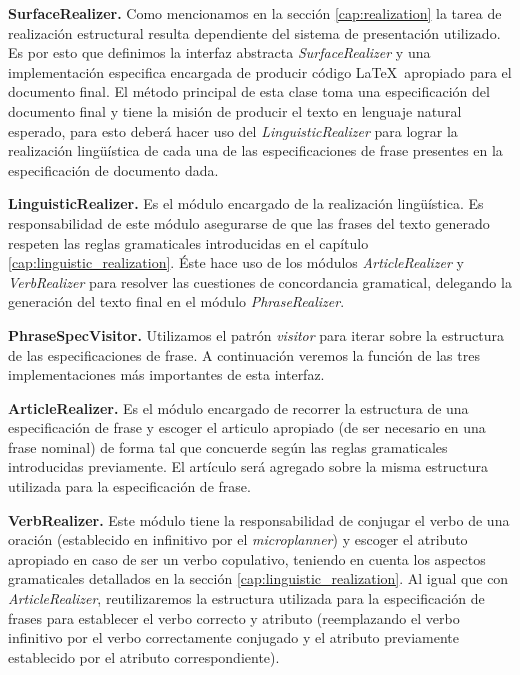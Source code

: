 \bigskip
\noindent
\textbf{SurfaceRealizer.} Como mencionamos en la sección \ref{cap:realization} la tarea de realización estructural resulta dependiente del sistema de presentación utilizado. Es por esto que definimos la interfaz abstracta \textit{SurfaceRealizer} y una implementación especifica encargada de producir código \LaTeX~apropiado para el documento final. El método principal de esta clase toma una especificación del documento final y tiene la misión de producir el texto en lenguaje natural esperado, para esto deberá hacer uso del \textit{LinguisticRealizer} para lograr la realización lingüística de cada una de las especificaciones de frase presentes en la especificación de documento dada. 


\bigskip
\noindent
\textbf{LinguisticRealizer.} Es el módulo encargado de la realización lingüística. Es responsabilidad de este módulo asegurarse de que las frases del texto generado respeten las reglas gramaticales introducidas en el capítulo \ref{cap:linguistic_realization}. Éste hace uso de los módulos \textit{ArticleRealizer} y \textit{VerbRealizer} para resolver las cuestiones de concordancia gramatical, delegando la generación del texto final en el módulo \textit{PhraseRealizer}. 

\bigskip
\noindent
\textbf{PhraseSpecVisitor.} Utilizamos el patrón \textit{visitor} para iterar sobre la estructura de las especificaciones de frase. A continuación veremos la función de las tres implementaciones más importantes de esta interfaz. 

\bigskip
\noindent
\textbf{ArticleRealizer.} Es el módulo encargado de recorrer la estructura de una especificación de frase y escoger el articulo apropiado (de ser necesario en una frase nominal) de forma tal que concuerde según las reglas gramaticales introducidas previamente. El artículo será agregado sobre la misma estructura utilizada para la especificación de frase.

\bigskip
\noindent
\textbf{VerbRealizer.} Este módulo tiene la responsabilidad de conjugar el verbo de una oración (establecido en infinitivo por el \textit{microplanner}) y escoger el atributo apropiado en caso de ser un verbo copulativo, teniendo en cuenta los aspectos gramaticales detallados en la sección \ref{cap:linguistic_realization}. Al igual que con \textit{ArticleRealizer}, reutilizaremos la estructura utilizada para la especificación de frases para establecer el verbo correcto y atributo (reemplazando el verbo infinitivo por el verbo correctamente conjugado y el atributo previamente establecido por el atributo correspondiente).

